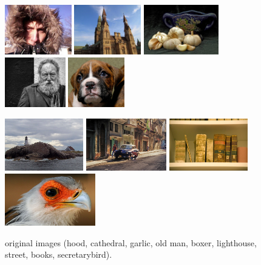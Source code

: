 \begin{figure}\centering
\includegraphics[height=0.858in]{images/hood-orig.jpg}
\includegraphics[height=0.858in]{images/cathedral-orig.jpg}
\includegraphics[height=0.858in]{images/garlic-orig.jpg}
\includegraphics[height=0.858in]{images/oldman-orig.jpg}
\includegraphics[height=0.858in]{images/boxer-orig.jpg}

\vspace{0.02in}

\includegraphics[height=0.8980in]{images/lighthouse-orig.jpg}
\includegraphics[height=0.8980in]{images/street-orig.jpg}
\includegraphics[height=0.8980in]{images/books-orig.jpg}
\includegraphics[height=0.8980in]{images/bird-orig.jpg}
\caption{original images (hood, cathedral, garlic, old man, boxer, lighthouse, street, books, secretarybird).}
\label{originalImages}
\end{figure}

